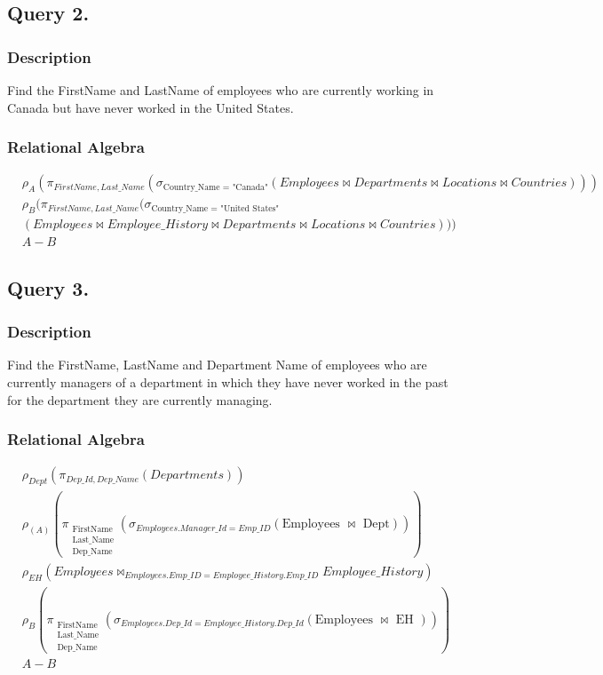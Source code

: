 \documentclass[a4paper]{article}
\begin{document}
\subsection{Query 2.}
\subsubsection{Description}
Find the FirstName and LastName of employees who are currently working in
Canada but have never worked in the United States.
\subsubsection{Relational Algebra}
\begin{align*}
    &\rho_{A}(\pi_{FirstName, Last\_Name} (\sigma_{\text{Country\_Name = "Canada"}} (Employees \bowtie Departments \bowtie Locations \bowtie Countries)  )) \\
    &\rho_{B}(\pi_{FirstName, Last\_Name} (\sigma_{\text{Country\_Name = "United States"}} \\
    &(Employees \bowtie Employee\_History \bowtie Departments \bowtie Locations \bowtie Countries)  )) \\
    & A - B
\end{align*}

\newpage
\subsection{Query 3.}
\subsubsection{Description}
Find the FirstName, LastName and Department Name of employees who are
currently managers of a department in which they have never worked in the past
for the department they are currently managing.
\subsubsection{Relational Algebra}

\begin{align*}
&\rho_{Dept} (\pi_{Dep\_Id, Dep\_Name} (Departments)) \\
&\rho_{(A)} (\pi_{\substack{
    \text{FirstName} \\
    \text{Last\_Name} \\
    \text{Dep\_Name}
    }}
    (\sigma_{Employees.Manager\_Id = Emp\_ID} (\text{Employees } \bowtie \text{ Dept}))
    ) \\
&\rho_{EH} (Employees \bowtie_{Employees.Emp\_ID = Employee\_History.Emp\_ID} Employee\_History) \\
&\rho_{B} (\pi_{\substack{
    \text{FirstName} \\
    \text{Last\_Name} \\
    \text{Dep\_Name}
    }
}
(\sigma_{Employees.Dep\_Id = Employee\_History.Dep\_Id} (\text{Employees } \bowtie \text{ EH })) ) \\
&A - B
\end{align*}
\end{document}
